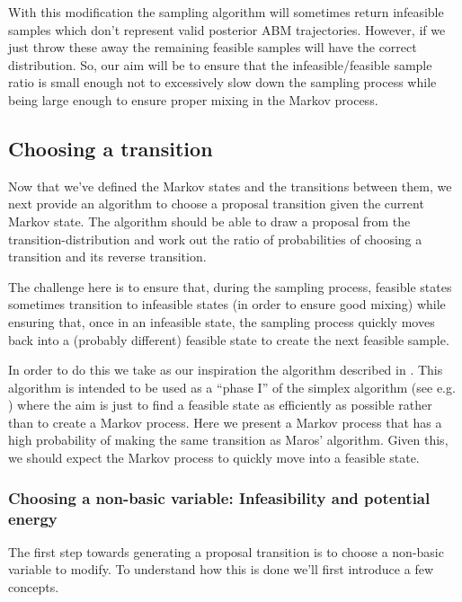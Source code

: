 \documentclass{article}
\begin{document}
With this modification the sampling algorithm will sometimes return infeasible samples which don't represent valid posterior ABM trajectories. However, if we just throw these away the remaining feasible samples will have the correct distribution. So, our aim will be to ensure that the infeasible/feasible sample ratio is small enough not to excessively slow down the sampling process while being large enough to ensure proper mixing in the Markov process.

\subsection{Choosing a transition}

Now that we've defined the Markov states and the transitions between them, we next provide an algorithm to choose a proposal transition given the current Markov state. The algorithm should be able to draw a proposal from the transition-distribution and work out the ratio of probabilities of choosing a transition and its reverse transition.

The challenge here is to ensure that, during the sampling process, feasible states sometimes transition to infeasible states (in order to ensure good mixing) while ensuring that, once in an infeasible state, the sampling process quickly moves back into a (probably different) feasible state to create the next feasible sample.

In order to do this we take as our inspiration the algorithm described in \cite{maros1986general}. This algorithm is intended to be used as a ``phase I'' of the simplex algorithm (see e.g. \cite{vanderbei2015linear}) where the aim is just to find a feasible state as efficiently as possible rather than to create a Markov process. Here we present a Markov process that has a high probability of making the same transition as Maros' algorithm. Given this, we should expect the Markov process to quickly move into a feasible state.

\subsubsection{Choosing a non-basic variable: Infeasibility and potential energy}

The first step towards generating a proposal transition is to choose a non-basic variable to modify. To understand how this is done we'll first introduce a few concepts.
\end{document}
